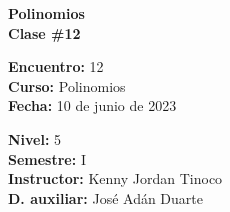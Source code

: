 \begin{center} \textbf
{
    \Large Polinomios \\ \vspace{2mm}Clase \#12
}
\end{center}

\begin{multicols}{2}
{
    \textbf{Encuentro:} 12\\
    \textbf{Curso:} Polinomios\\
    \textbf{Fecha:} 10 de junio de 2023\\
    \begin{flushright}
        \textbf{Nivel:} 5\\
        \textbf{Semestre:} I\\
        \textbf{Instructor:} Kenny Jordan Tinoco\\
        \textbf{D. auxiliar: }José Adán Duarte
    \end{flushright}
}
\end{multicols}

\thispagestyle{first-page-style}